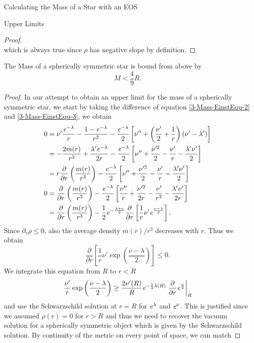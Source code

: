 \begin{section}{Calculating the Mass of a Star with an EOS}
\begin{subsection}{Upper Limits}
\begin{proof}
\begin{equation}
	\end{equation}
	which is always true since $\rho$ has negative slope by definition.
\end{proof}\noindent
\begin{theorem}
	The Mass of a spherically symmetric star is bound from above by
	\begin{equation}
		M < \frac{4}{9}R.
	\end{equation}
\end{theorem}
\begin{proof}
	In our attempt to obtain an upper limit for the mass of a spherically symmetric star, we start by taking the difference of equation \eqref{3-Mass-EinstEqu-2} and \eqref{3-Mass-EinstEqu-3}, we obtain 
	\begin{align}
		0 &= \nu'\frac{\mathit{e}^{-\lambda}}{r} - \frac{1-\mathit{e}^{-\lambda}}{r^2} - \frac{\mathit{e}^{-\lambda}}{2}\left[\nu''+\left(\frac{\nu'}{2} + \frac{1}{r}\right)\left(\nu'-\lambda'\right) \right]\\
		&= - \frac{2m(r)}{r^3} + \frac{\lambda'\mathit{e}^{-\lambda}}{2r} -  \frac{\mathit{e}^{-\lambda}}{2}\left[\nu''+ \frac{\nu'^2}{2} - \frac{\nu'}{r} -\frac{\lambda'\nu'}{2}\right]\\
		&= r\frac{\partial}{\partial r}\left(\frac{m(r)}{r^3}\right) - \frac{\mathit{e}^{-\lambda}}{2}\left[\nu''+ \frac{\nu'^2}{2} - \frac{\nu'}{r} -\frac{\lambda'\nu'}{2}\right]\\
		0 &= \frac{\partial}{\partial r}\left(\frac{m(r)}{r^3}\right) - \frac{\mathit{e}^{-\lambda}}{2}\left[\frac{\nu''}{r}+ \frac{\nu'^2}{2r} - \frac{\nu'}{r^2} -\frac{\lambda'\nu'}{2r}\right]\\
		&= \frac{\partial}{\partial r}\left(\frac{m(r)}{r^3}\right) - \frac{1}{2}\mathit{e}^{-\frac{\lambda+\nu}{2}}\frac{\partial}{\partial r}\left[\frac{1}{r}\nu'\mathit{e}^{\frac{\nu-\lambda}{2}}\right].
	\end{align}
	Since $\partial_r\rho\leq0$, also the average density $m(r)/r^3$ decreases with $r$. Thus we obtain
	\begin{equation}
		\frac{\partial}{\partial r}\left[\frac{1}{r}\nu'\exp\left(\frac{\nu-\lambda}{2}\right) \right] \leq 0.
	\end{equation}
	We integrate this equation from $R$ to $r<R$
	\begin{equation}
		\frac{\nu'}{r}\exp\left(\frac{\nu-\lambda}{2}\right)\geq\frac{2\nu'(R)}{R}\mathit{e}^{-\frac{1}{2}\lambda(R)}\left.\frac{\partial}{\partial r}\mathit{e}^{\frac{\nu}{2}}\right|_R
	\end{equation}
	and use the Schwarzschild solution at $r=R$ for $\mathit{e}^\lambda$ and $\mathit{e}^\nu$. This is justified since we assumed $\rho(r)=0$ for $r>R$ and thus we need to recover the vacuum solution for a spherically symmetric object which is given by the Schwarzschild solution. By continuity of the metric on every point of space, we can match 

\end{proof}
\end{subsection}
\end{section}
